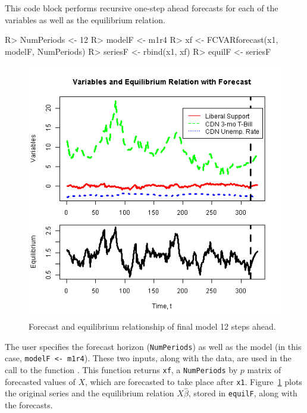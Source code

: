 \documentclass[article]{jss}
\newcommand{\fct}[1]{\code{#1()}}
\begin{document}
This code block 
performs recursive one-step ahead forecasts for each of the variables as well as the equilibrium relation. 

\begin{Code}
R> NumPeriods <- 12
R> modelF <- m1r4
R> xf <- FCVARforecast(x1, modelF, NumPeriods)
R> seriesF <- rbind(x1, xf) 
R> equilF <- seriesF %
\end{Code}

\begin{figure}[H]
  \centering
  \includegraphics[scale = 1, keepaspectratio=true]{Figures/forecast_vars_eqbm.png}
  \caption{Forecast and equilibrium relationship of final model 12 steps ahead.}
  \label{fig:forecast}
\end{figure}


The user specifies the forecast horizon (\verb|NumPeriods|) as well as the model (in this case, \verb|modelF <- m1r4|). These two inputs, along with the data, are used in the call to the function \fct{FCVARforecast}. This function returns \verb|xf|, a \verb|NumPeriods| by $p$ matrix of forecasted values of $X$, 
which are forecasted to take place after \verb|x1|. 
Figure~\ref{fig:forecast} plots the original series and the equilibrium relation $X\hat{\beta}$, stored in \verb|equilF|,  along with the forecasts. 
\end{document}
